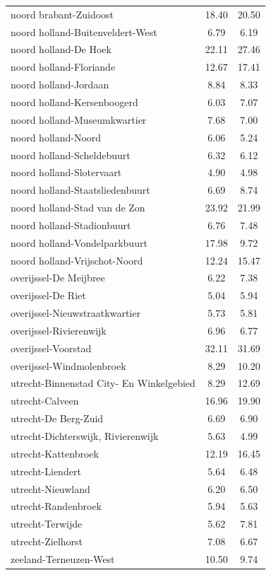 \begin{longtable}{lcc}
noord brabant-Zuidoost & 18.40 & 20.50 \\
noord holland-Buitenveldert-West & 6.79 & 6.19 \\
noord holland-De Hoek & 22.11 & 27.46 \\
noord holland-Floriande & 12.67 & 17.41 \\
noord holland-Jordaan & 8.84 & 8.33 \\
noord holland-Kersenboogerd & 6.03 & 7.07 \\
noord holland-Museumkwartier & 7.68 & 7.00 \\
noord holland-Noord & 6.06 & 5.24 \\
noord holland-Scheldebuurt & 6.32 & 6.12 \\
noord holland-Slotervaart & 4.90 & 4.98 \\
noord holland-Staatsliedenbuurt & 6.69 & 8.74 \\
noord holland-Stad van de Zon & 23.92 & 21.99 \\
noord holland-Stadionbuurt & 6.76 & 7.48 \\
noord holland-Vondelparkbuurt & 17.98 & 9.72 \\
noord holland-Vrijschot-Noord & 12.24 & 15.47 \\
overijssel-De Meijbree & 6.22 & 7.38 \\
overijssel-De Riet & 5.04 & 5.94 \\
overijssel-Nieuwstraatkwartier & 5.73 & 5.81 \\
overijssel-Rivierenwijk & 6.96 & 6.77 \\
overijssel-Voorstad & 32.11 & 31.69 \\
overijssel-Windmolenbroek & 8.29 & 10.20 \\
utrecht-Binnenstad City- En Winkelgebied & 8.29 & 12.69 \\
utrecht-Calveen & 16.96 & 19.90 \\
utrecht-De Berg-Zuid & 6.69 & 6.90 \\
utrecht-Dichterswijk, Rivierenwijk & 5.63 & 4.99 \\
utrecht-Kattenbroek & 12.19 & 16.45 \\
utrecht-Liendert & 5.64 & 6.48 \\
utrecht-Nieuwland & 6.20 & 6.50 \\
utrecht-Randenbroek & 5.94 & 5.63 \\
utrecht-Terwijde & 5.62 & 7.81 \\
utrecht-Zielhorst & 7.08 & 6.67 \\
zeeland-Terneuzen-West & 10.50 & 9.74 \\

\end{longtable}
